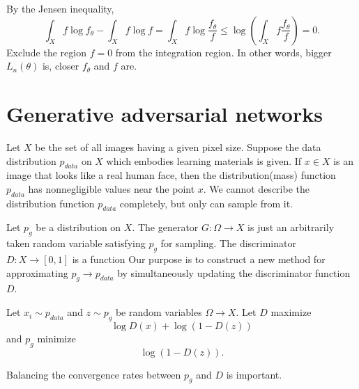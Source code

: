 \documentclass{../exp}
\begin{document}
By the Jensen inequality, 
\[\int_Xf\log f_\theta-\int_Xf\log f=\int_Xf\log\frac{f_\theta}f\le\log\left(\int_Xf\frac{f_\theta}f\right)=0.\]
Exclude the region $f=0$ from the integration region.
In other words, bigger $L_n(\theta)$ is, closer $f_\theta$ and $f$ are.




\section{Generative adversarial networks}
Let $X$ be the set of all images having a given pixel size.
Suppose the data distribution $p_{data}$ on $X$ which embodies learning materials is given.
If $x\in X$ is an image that looks like a real human face, then the distribution(mass) function $p_{data}$ has nonnegligible values near the point $x$.
We cannot describe the distribution function $p_{data}$ completely, but only can sample from it.

Let $p_g$ be a distribution on $X$.
The generator $G:\Omega\to X$ is just an arbitrarily taken random variable satisfying $p_g$ for sampling.
The discriminator $D:X\to[0,1]$ is a function
Our purpose is to construct a new method for approximating $p_g\to p_{data}$ by simultaneously updating the discriminator function $D$.

Let $x_i\sim p_{data}$ and $z\sim p_g$ be random variables $\Omega\to X$.
Let $D$ maximize
\[\log D(x)+\log(1-D(z))\]
and $p_g$ minimize
\[\log(1-D(z)).\]


Balancing the convergence rates between $p_g$ and $D$ is important.
\end{document}
